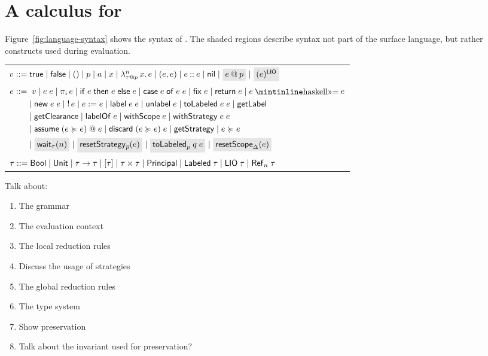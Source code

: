 \documentclass[conference]{IEEEtran}
\begin{document}
\section{A calculus for \lang}\label{lab:calculus}
Figure~\ref{fig:language-syntax} shows the syntax of \lang. The shaded regions describe syntax not part of the surface language, but rather constructs used during evaluation.

\begin{figure*}
    \centering
    \begin{tabular}{l}
         $\val ::= \true \mid \false \mid () \mid p \mid \addr \mid x \mid \abs{n}{\lb{p}{\type}}{x}{\expr} \mid (\expr, \expr) \mid \cons{\expr}{\expr} \mid \nil \mid \graybox{\lb{p}{\expr}} \mid \graybox{\lio{\expr}}$ \\
         $\begin{aligned}[t]
         \expr ::=&\;\; \val \mid \app{\expr}{\expr} \mid \proj{i}{\expr} \mid \ifexpr{\expr}{\expr}{\expr} \mid \case{\expr}{\expr}{\expr} \mid \fix{\expr} \mid \return{\expr} \mid \bind{\expr}{\expr} \\ &\mid
         \new{\expr}{\expr} \mid \readref{\expr} \mid \writeref{\expr}{\expr} \mid \Label{\expr}{\expr} \mid \unlabel{\expr} \mid
         \tolabeled{\expr}{\expr} \mid \getlabel \\ &\mid \getclearance \mid \labelof{\expr} \mid \withscope{\expr} \mid \withstrategy{\expr}{\expr} \\ &\mid \adddelegate{\expr}{\expr}{\expr} \mid \removedelegate{\expr}{\expr}{\expr} \mid \getstrategy \mid \expr \actsfor \expr \\ &\mid
         \graybox{\wait{n}[\type]} \mid \graybox{\resetstrategy{\overline{p}}{\expr}} \mid \graybox{\resetTolabeled{p}{q}{\expr}} \mid \graybox{\resetscope{\scope}{\expr}}
         \end{aligned}$ \\
         $\type ::= \bool \mid \unit \mid \func{\type}{\type} \mid \listtype{\type} \mid \pair{\type}{\type} \mid \labeltype \mid \labeled{\type} \mid \liotype{\type} \mid \reftype[n]{\type}$ \\
    \end{tabular}
    \caption{The \lang{} language}
    \label{fig:language-syntax}
\end{figure*}

Talk about:
\begin{enumerate}
    \item The grammar
    \item The evaluation context
    \item The local reduction rules
    \item Discuss the usage of strategies
    \item The global reduction rules
    \item The type system
    \item Show preservation
    \item Talk about the invariant used for preservation?
\end{enumerate}
\end{document}
